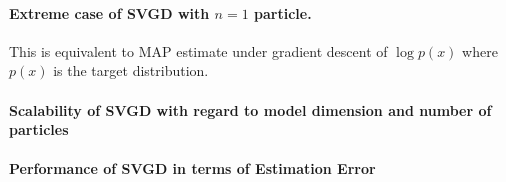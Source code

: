 \paragraph{Extreme case of SVGD with $n=1$ particle.} This is equivalent to MAP estimate under gradient descent of $\log p(x)$ where $p(x)$ is the target distribution.


\paragraph{Scalability of SVGD with regard to model dimension and number of particles}


\paragraph{Performance of SVGD in terms of Estimation Error}